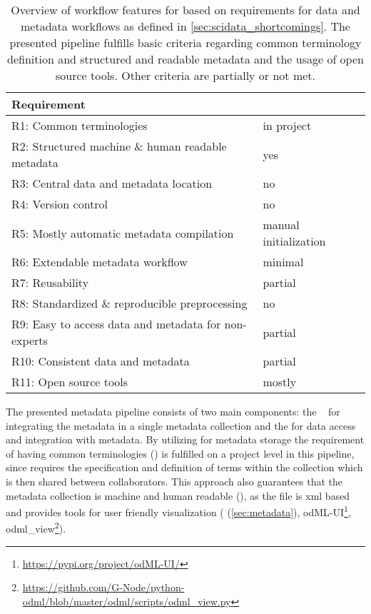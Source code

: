 \begin{table}[]
\begin{tabular}{|l|l|}
\hline
Requirement                                          &  \cite{Brochier_2018} \\  \hline
R1: Common terminologies                             &  in project \\ \hline
R2: Structured machine \& human readable metadata    &  yes \\ \hline
R3: Central data and metadata location               &  no \\ \hline
R4: Version control                                  &  no \\ \hline
R5: Mostly automatic metadata compilation            &  manual initialization \\ \hline
R6: Extendable metadata workflow                     &  minimal \\ \hline
R7: Reusability                                      &  partial \\ \hline
R8: Standardized \& reproducible preprocessing       &  no \\ \hline
R9: Easy to access data and metadata for non-experts &  partial \\ \hline
R10: Consistent data and metadata                    &  partial \\ \hline
R11: Open source tools                               &  mostly \\ \hline
\end{tabular}
\caption[Overview of workflow features for \citet{Brochier_2018}]{Overview of workflow features for \citet{Brochier_2018} based on requirements for data and metadata workflows as defined in \cref{sec:scidata_shortcomings}. The presented pipeline fulfills basic criteria regarding common terminology definition and structured and readable metadata and the usage of open source tools. Other criteria are partially or not met.}
\label{tab:requirement_check_scidata}
\end{table}

The presented metadata pipeline consists of two main components: the \  for integrating the metadata in a single  metadata collection and the  for data access and integration with metadata. By utilizing  for metadata storage the requirement of having common terminologies () is fulfilled on a project level in this pipeline, since  requires the specification and definition of terms within the collection which is then shared between collaborators. This approach also guarantees that the metadata collection is machine and human readable (), as the  file is xml based and provides tools for user friendly visualization ( (\cref{sec:metadata}), odML-UI\footnote{\url{https://pypi.org/project/odML-UI/}}, odml\_view\footnote{\url{https://github.com/G-Node/python-odml/blob/master/odml/scripts/odml_view.py}}).

